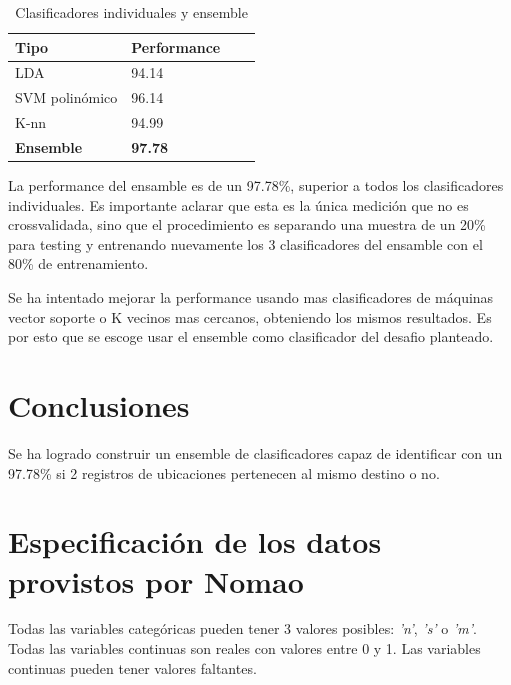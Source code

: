 \documentclass[journal]{IEEEtran}
\begin{document}
\begin{table}[ht!]
\caption{Clasificadores individuales y ensemble}
\label{table:ensemble_summary}
\centering
\begin{tabular}{l | l l l }
Tipo & Performance  \\
\hline
LDA & 94.14 \\
SVM polinómico & 96.14 \\
K-nn & 94.99 \\
\hline
\textbf{Ensemble} & \textbf{97.78} \\
\end{tabular}
\end{table}

La performance del ensamble es de un 97.78\%, superior a todos los
clasificadores individuales. Es importante aclarar
que esta es la única medición que no es crossvalidada, sino que el 
procedimiento es separando una muestra de un 20\% para testing y
entrenando nuevamente los 3 clasificadores del ensamble con el 80\%
de entrenamiento.

Se ha intentado mejorar la performance usando mas clasificadores de
máquinas vector soporte o K vecinos mas cercanos, obteniendo los
mismos resultados. Es por esto que se escoge usar el ensemble
como clasificador del desafio planteado.


\section{Conclusiones}
Se ha logrado construir un ensemble de clasificadores capaz de identificar
con un 97.78\% si 2 registros de ubicaciones pertenecen al mismo destino o no.



\appendices

\section{Especificación de los datos provistos por Nomao}
\label{appendix1}
Todas las variables categóricas pueden tener 3 valores posibles:
\textit{'n'}, \textit{'s'} o \textit{'m'}.
Todas las variables continuas son reales con valores entre 
0 y 1. Las variables continuas pueden tener valores faltantes.
\end{document}
